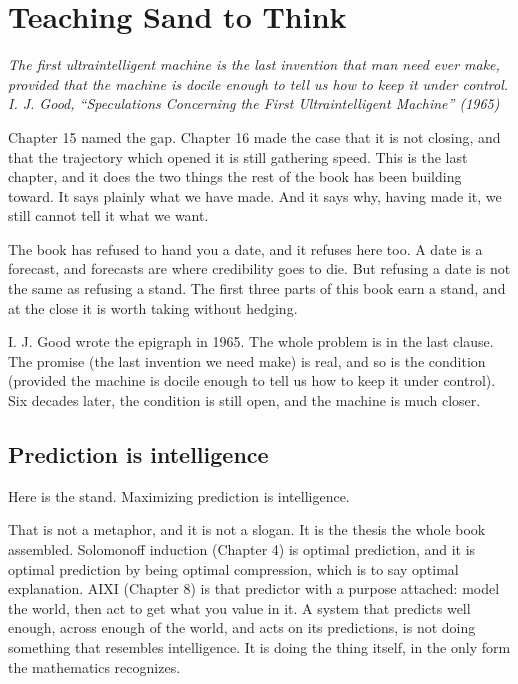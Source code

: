 \chapter{Teaching Sand to Think}

\vspace{1em}
\hfill
\begin{minipage}[c]{0.72\textwidth}
\raggedleft
\small\itshape
The first ultraintelligent machine is the last invention that man need ever make, provided that the machine is docile enough to tell us how to keep it under control.\\[0.5em]
\upshape\footnotesize I. J. Good, ``Speculations Concerning the First Ultraintelligent Machine'' (1965)
\end{minipage}
\vspace{1.5em}

\noindent Chapter 15 named the gap. Chapter 16 made the case that it is not closing, and that the trajectory which opened it is still gathering speed. This is the last chapter, and it does the two things the rest of the book has been building toward. It says plainly what we have made. And it says why, having made it, we still cannot tell it what we want.

The book has refused to hand you a date, and it refuses here too. A date is a forecast, and forecasts are where credibility goes to die. But refusing a date is not the same as refusing a stand. The first three parts of this book earn a stand, and at the close it is worth taking without hedging.

I. J. Good wrote the epigraph in 1965. The whole problem is in the last clause. The promise (the last invention we need make) is real, and so is the condition (provided the machine is docile enough to tell us how to keep it under control). Six decades later, the condition is still open, and the machine is much closer.

\section*{Prediction is intelligence}

Here is the stand. Maximizing prediction is intelligence.

That is not a metaphor, and it is not a slogan. It is the thesis the whole book assembled. Solomonoff induction (Chapter 4) is optimal prediction, and it is optimal prediction by being optimal compression, which is to say optimal explanation. AIXI (Chapter 8) is that predictor with a purpose attached: model the world, then act to get what you value in it. A system that predicts well enough, across enough of the world, and acts on its predictions, is not doing something that resembles intelligence. It is doing the thing itself, in the only form the mathematics recognizes.

